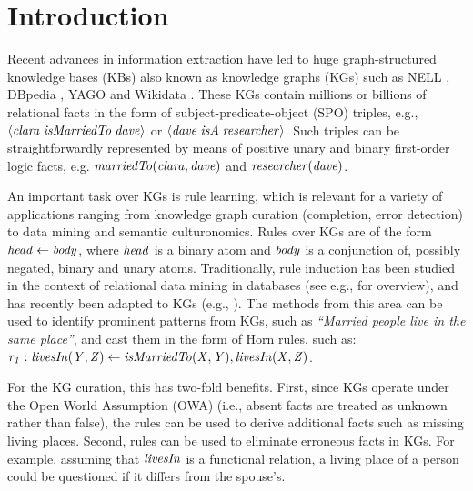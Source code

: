 \section{Introduction}
\label{sec:intro}

Recent advances in information extraction have led to
huge graph-structured knowledge bases (KBs) also known as knowledge graphs (KGs) such as NELL \cite{nell}, DBpedia \cite{dbpedia}, YAGO \cite{yago} and Wikidata \cite{wikidata}. These KGs contain millions or billions of relational facts in the form of subject-predicate-object (SPO) triples, e.g., $\langle\mathit{clara\;isMarriedTo\;dave}\rangle$ or $\langle\mathit{dave\;isA\;researcher}\rangle$. Such triples can be straightforwardly represented by means of positive unary and binary first-order logic facts, e.g. $\mathit{marriedTo(clara,dave)}$ and $\mathit{researcher(dave)}$.

An important task over KGs is rule learning, which is relevant for a variety of applications ranging from knowledge graph curation (completion, error detection) \cite{DBLP:journals/semweb/Paulheim17} to data mining and semantic culturonomics. Rules over KGs are of the form $\mathit{head \leftarrow body}$, where $\mathit{head}$ is a binary atom and $\mathit{body}$ is a conjunction of, possibly negated, binary and unary atoms. 
Traditionally, rule induction has been studied in the context of relational data mining in databases (see e.g., \cite{DBLP:books/daglib/0021868} for overview), and has recently been adapted to KGs (e.g., \cite{amie,op,rdf2rules}). The methods from this area can be used to identify prominent patterns from KGs, such as \emph{``Married people live in the same
place''}, and cast them in the form of Horn rules, such as:
$\mathit{r_1:\;}\mathit{livesIn(Y,Z)}\leftarrow \mathit{isMarriedTo(X,Y),livesIn(X,Z)}$. 

For the KG curation, this has two-fold benefits. First, since KGs operate under the Open World
Assumption (OWA) (i.e., absent facts are treated as unknown rather than false),
the rules can be used to derive additional facts such as missing living places. %
Second, rules can be used to eliminate erroneous facts in KGs. For example, assuming that $\mathit{livesIn}$ is a functional relation, %
a living place of a person could be questioned if it differs from the spouse's.

